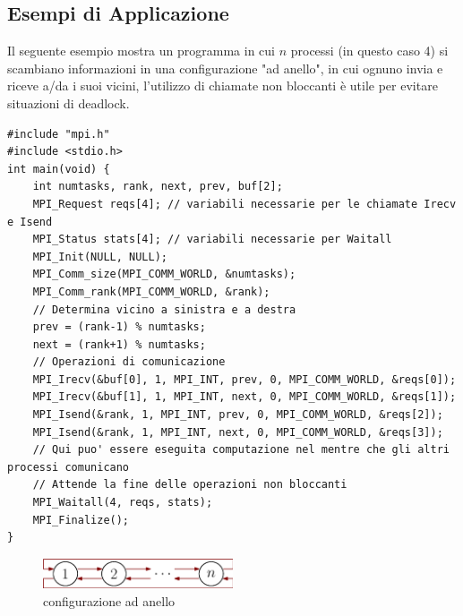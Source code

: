 \documentclass[10pt, letterpaper]{report}
\begin{document}
\subsection{Esempi di Applicazione}
Il seguente esempio mostra un programma in cui $n$ processi (in questo caso 4) si scambiano informazioni 
in una configurazione "ad anello", in cui ognuno invia e riceve a/da i suoi vicini, l'utilizzo di chiamate non bloccanti 
è utile per evitare situazioni di deadlock.
\begin{lstlisting}[style=CStyle]
#include "mpi.h" 
#include <stdio.h> 
int main(void) { 
    int numtasks, rank, next, prev, buf[2]; 
    MPI_Request reqs[4]; // variabili necessarie per le chiamate Irecv e Isend
    MPI_Status stats[4]; // variabili necessarie per Waitall  
    MPI_Init(NULL, NULL); 
    MPI_Comm_size(MPI_COMM_WORLD, &numtasks); 
    MPI_Comm_rank(MPI_COMM_WORLD, &rank);
    // Determina vicino a sinistra e a destra
    prev = (rank-1) % numtasks; 
    next = (rank+1) % numtasks; 
    // Operazioni di comunicazione
    MPI_Irecv(&buf[0], 1, MPI_INT, prev, 0, MPI_COMM_WORLD, &reqs[0]); 
    MPI_Irecv(&buf[1], 1, MPI_INT, next, 0, MPI_COMM_WORLD, &reqs[1]); 
    MPI_Isend(&rank, 1, MPI_INT, prev, 0, MPI_COMM_WORLD, &reqs[2]); 
    MPI_Isend(&rank, 1, MPI_INT, next, 0, MPI_COMM_WORLD, &reqs[3]); 
    // Qui puo' essere eseguita computazione nel mentre che gli altri processi comunicano
    // Attende la fine delle operazioni non bloccanti
    MPI_Waitall(4, reqs, stats); 
    MPI_Finalize(); 
}
\end{lstlisting}
\begin{center}
    \begin{figure}[h!]
        \center
        \includegraphics[width=0.5\textwidth]{images/ring.eps}
        \caption{configurazione ad anello}
        \label{fig:ring}
    \end{figure}
\end{center}
\end{document}

